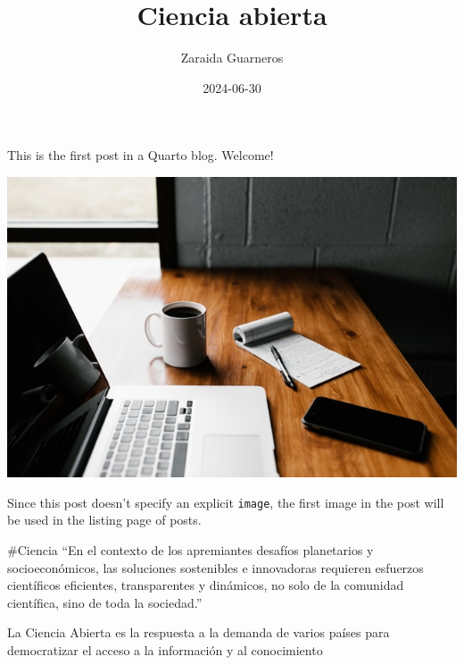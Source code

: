 \documentclass[
  letterpaper,
  DIV=11,
  numbers=noendperiod]{scrartcl}
\title{Ciencia abierta}
\author{Zaraida Guarneros}
\date{2024-06-30}
\renewcommand*\contentsname{Tabla de contenidos}
\newcommand\contentsname{Tabla de contenidos}
\theoremstyle{definition}
\theoremstyle{remark}
\begin{document}
\maketitle

\renewcommand*\contentsname{Tabla de contenidos}
{
\hypersetup{linkcolor=}
\setcounter{tocdepth}{3}
\tableofcontents
}
\listoftables
This is the first post in a Quarto blog. Welcome!

\includegraphics{thumbnail.jpg}

Since this post doesn't specify an explicit \texttt{image}, the first
image in the post will be used in the listing page of posts.

\begin{tcolorbox}[enhanced jigsaw, left=2mm, title=\textcolor{quarto-callout-note-color}{\faInfo}\hspace{0.5em}{Nota}, colbacktitle=quarto-callout-note-color!10!white, opacitybacktitle=0.6, opacityback=0, colframe=quarto-callout-note-color-frame, colback=white, rightrule=.15mm, toprule=.15mm, bottomrule=.15mm, bottomtitle=1mm, coltitle=black, breakable, toptitle=1mm, titlerule=0mm, arc=.35mm, leftrule=.75mm]

\#Ciencia ``En el contexto de los apremiantes desafíos planetarios y
socioeconómicos, las soluciones sostenibles e innovadoras requieren
esfuerzos científicos eficientes, transparentes y dinámicos, no solo de
la comunidad científica, sino de toda la sociedad.''

\end{tcolorbox}

La Ciencia Abierta es la respuesta a la demanda de varios países para
democratizar el acceso a la información y al conocimiento
\end{document}
